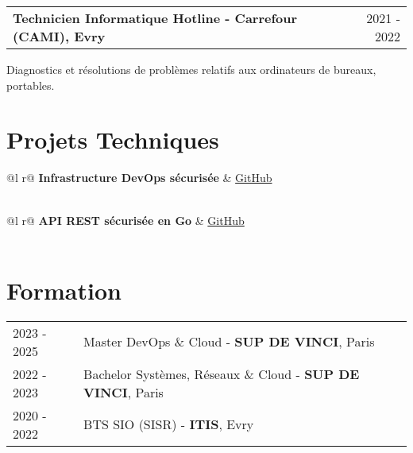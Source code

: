 \documentclass[a4paper,12pt]{article}
\makeatletter
\newenvironment{jobshort}[2]
    {
    \begin{tabularx}{\linewidth}{@{}l X r@{}}
    \textbf{#1} & \hfill &  #2 \\[3.75pt]
    \end{tabularx}
    }
    {
    }
\makeatother
\begin{document}
\begin{jobshort}{Technicien Informatique Hotline - Carrefour (CAMI), Evry}{2021 - 2022}
Diagnostics et résolutions de problèmes relatifs aux ordinateurs de bureaux, portables.
\end{jobshort}

\section{Projets Techniques}

\begin{tabularx}{\linewidth}{ @{}l r@{} }
\textbf{Infrastructure DevOps sécurisée} & \hfill \href{https://github.com/Rahman-git7}{GitHub} \\[3.75pt]
  \\
\end{tabularx}

\begin{tabularx}{\linewidth}{ @{}l r@{} }
\textbf{API REST sécurisée en Go} & \hfill \href{https://github.com/Rahman-git7}{GitHub} \\[3.75pt]
  \\
\end{tabularx}

\section{Formation}
\begin{tabularx}{\linewidth}{@{}l X@{}}	
2023 - 2025 & Master DevOps \& Cloud - \textbf{SUP DE VINCI}, Paris \\
2022 - 2023 & Bachelor Systèmes, Réseaux \& Cloud - \textbf{SUP DE VINCI}, Paris \\ 
2020 - 2022 & BTS SIO (SISR) - \textbf{ITIS}, Evry \\
\end{tabularx}

\end{document}
